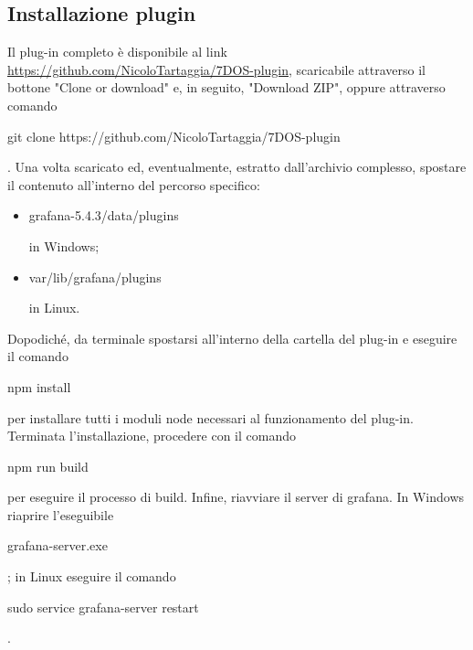 \subsection{Installazione plugin}
Il plug-in completo è disponibile al link \url{https://github.com/NicoloTartaggia/7DOS-plugin}, scaricabile attraverso il bottone "Clone or download" e, in seguito, "Download ZIP", oppure attraverso comando \begin{ttfamily}git clone https://github.com/NicoloTartaggia/7DOS-plugin\end{ttfamily}. Una volta scaricato ed, eventualmente, estratto dall'archivio complesso, spostare il contenuto all'interno del percorso specifico: 
\begin{itemize}
	\item{\begin{ttfamily}grafana-5.4.3/data/plugins\end{ttfamily}} in Windows; \item{\begin{ttfamily}var/lib/grafana/plugins\end{ttfamily} in Linux.}
\end{itemize}
Dopodiché, da terminale spostarsi all'interno della cartella del plug-in e eseguire il comando \begin{ttfamily}npm install\end{ttfamily} per installare tutti i moduli node necessari al funzionamento del plug-in. Terminata l'installazione, procedere con il comando \begin{ttfamily}npm run build\end{ttfamily} per eseguire il processo di build. 
Infine, riavviare il server di grafana. In Windows riaprire l'eseguibile \begin{ttfamily}grafana-server.exe\end{ttfamily}; in Linux eseguire il comando \begin{ttfamily}sudo service grafana-server restart\end{ttfamily}.

